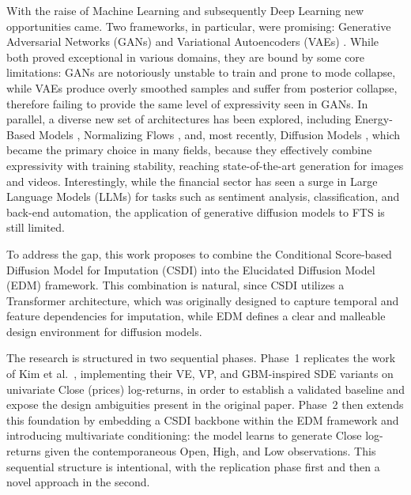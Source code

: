 With the raise of Machine Learning and subsequently Deep Learning new opportunities came.
Two frameworks, in particular, were promising: Generative Adversarial Networks (GANs) \cite{goodfellow2014generative, creswell2018generative}
and Variational Autoencoders (VAEs) \cite{kingma2014auto, kingma2019introduction}. While both proved exceptional in various domains, they are bound by some core limitations: GANs are notoriously unstable to train and prone to mode collapse, while VAEs produce overly smoothed samples and suffer
from posterior collapse, therefore failing to provide the same level of expressivity seen
in GANs. In parallel, a diverse new set of architectures has been
explored, including Energy-Based Models \cite{lecun2006tutorial}, Normalizing Flows \cite{rezende2015variational}, and, most recently, Diffusion Models \cite{ho2020ddpm, song2021score, song2021denoising, rombach2022high, dhariwal2021diffusion}, which became the primary choice in many fields, because they effectively combine
expressivity with training stability, reaching state-of-the-art generation for images and videos. Interestingly, while the financial sector has seen a surge in Large Language Models (LLMs)
for tasks such as sentiment analysis, classification, and back-end automation, the application of generative diffusion models to FTS is still limited. 

To address the gap, this work proposes to combine the Conditional Score-based Diffusion Model for Imputation (CSDI) \cite{tashiro2021csdi} into the Elucidated Diffusion Model (EDM) \cite{karras2022elucidating}
framework. This combination is natural, since CSDI utilizes a Transformer architecture, which was originally
designed to capture temporal and feature dependencies for imputation, while EDM defines a clear and malleable design environment for diffusion models. 

The research is structured in two sequential phases. Phase~1 replicates the work of Kim et al.\ \cite{kim2025diffusion}, implementing their VE, VP, and GBM-inspired SDE variants on univariate Close (prices) log-returns, in order to establish a validated baseline and expose the design ambiguities present in the original paper. Phase~2 then extends this foundation by embedding a CSDI backbone within the EDM framework and introducing multivariate conditioning: the model learns to generate Close log-returns given the contemporaneous Open, High, and Low observations. This sequential structure is intentional, with the replication phase first and then a novel approach in the second. 

